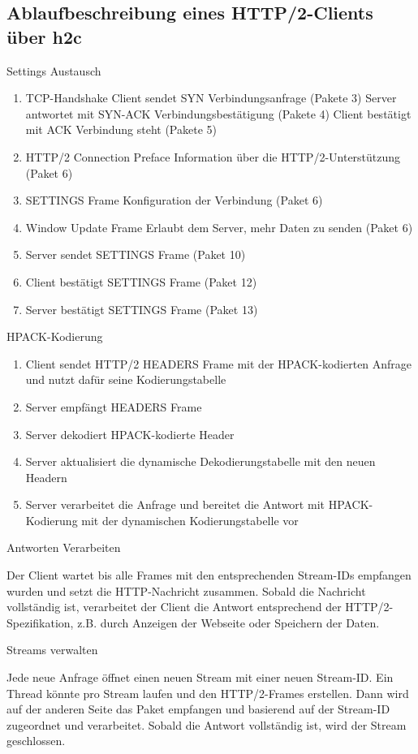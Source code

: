 \subsection{Ablaufbeschreibung eines HTTP/2-Clients über h2c}

Settings Austausch

\begin{enumerate}
    \item TCP-Handshake
    \subitem Client sendet SYN \textrightarrow{}Verbindungsanfrage (Pakete 3)
    \subitem Server antwortet mit SYN-ACK \textrightarrow{}Verbindungsbestätigung (Pakete 4)
    \subitem Client bestätigt mit ACK \textrightarrow{}Verbindung steht  (Pakete 5)
    \item HTTP/2 Connection Preface \textrightarrow{}Information über die HTTP/2-Unterstützung (Paket 6)
    \item SETTINGS Frame \textrightarrow{}Konfiguration der Verbindung (Paket 6)
    \item Window Update Frame \textrightarrow{}Erlaubt dem Server, mehr Daten zu senden (Paket 6)
    \item Server sendet SETTINGS Frame (Paket 10)
    \item Client bestätigt SETTINGS Frame (Paket 12)
    \item Server bestätigt SETTINGS Frame (Paket 13)
\end{enumerate}

HPACK-Kodierung

\begin{enumerate}
     \item Client sendet HTTP/2 HEADERS Frame mit der HPACK-kodierten Anfrage und nutzt dafür seine Kodierungstabelle
     \item Server empfängt HEADERS Frame 
     \item Server dekodiert HPACK-kodierte Header 
     \item Server aktualisiert die dynamische Dekodierungstabelle mit den neuen Headern
     \item Server verarbeitet die Anfrage und bereitet die Antwort mit HPACK-Kodierung mit der dynamischen Kodierungstabelle vor
\end{enumerate}

Antworten Verarbeiten

Der Client wartet bis alle Frames mit den entsprechenden Stream-IDs empfangen wurden und setzt die HTTP-Nachricht zusammen. Sobald die Nachricht vollständig ist, verarbeitet der Client die Antwort entsprechend der HTTP/2-Spezifikation, z.B. durch Anzeigen der Webseite oder Speichern der Daten.

Streams verwalten

Jede neue Anfrage öffnet einen neuen Stream mit einer neuen Stream-ID. Ein Thread könnte pro Stream laufen und den HTTP/2-Frames erstellen.
Dann wird auf der anderen Seite das Paket empfangen und basierend auf der Stream-ID zugeordnet und verarbeitet. Sobald die Antwort vollständig ist, wird der Stream geschlossen.
